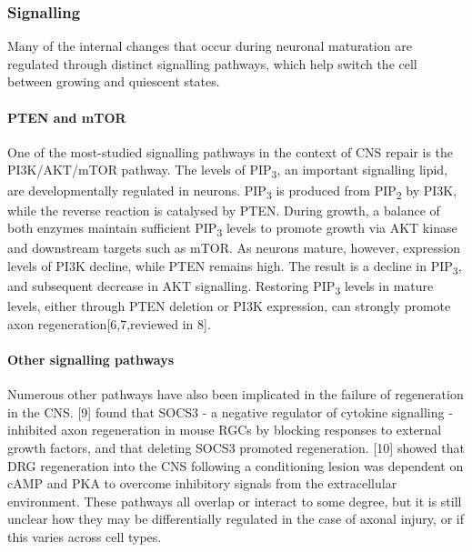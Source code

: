 \documentclass[
  12pt,
  a4paper,
]{book}
\begin{document}
\hypertarget{signalling}{%
\subsubsection{Signalling}\label{signalling}}

Many of the internal changes that occur during neuronal maturation are regulated through distinct signalling pathways, which help switch the cell between growing and quiescent states.

\hypertarget{pten-and-mtor}{%
\paragraph{PTEN and mTOR}\label{pten-and-mtor}}

One of the most-studied signalling pathways in the context of CNS repair is the PI3K/AKT/mTOR pathway. The levels of PIP\textsubscript{3}, an important signalling lipid, are developmentally regulated in neurons. PIP\textsubscript{3} is produced from PIP\textsubscript{2} by PI3K, while the reverse reaction is catalysed by PTEN. During growth, a balance of both enzymes maintain sufficient PIP\textsubscript{3} levels to promote growth via AKT kinase and downstream targets such as mTOR. As neurons mature, however, expression levels of PI3K decline, while PTEN remains high. The result is a decline in PIP\textsubscript{3}, and subsequent decrease in AKT signalling. Restoring PIP\textsubscript{3} levels in mature levels, either through PTEN deletion or PI3K expression, can strongly promote axon regeneration{[}6,7,reviewed in 8{]}.

\hypertarget{other-signalling-pathways}{%
\paragraph{Other signalling pathways}\label{other-signalling-pathways}}

Numerous other pathways have also been implicated in the failure of regeneration in the CNS. {[}9{]} found that SOCS3 - a negative regulator of cytokine signalling - inhibited axon regeneration in mouse RGCs by blocking responses to external growth factors, and that deleting SOCS3 promoted regeneration. {[}10{]} showed that DRG regeneration into the CNS following a conditioning lesion was dependent on cAMP and PKA to overcome inhibitory signals from the extracellular environment. These pathways all overlap or interact to some degree, but it is still unclear how they may be differentially regulated in the case of axonal injury, or if this varies across cell types.
\end{document}
